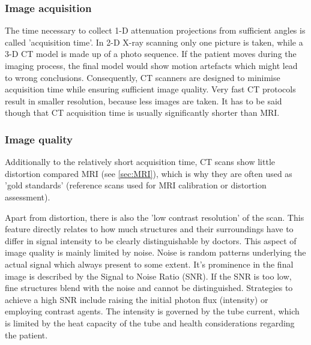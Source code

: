 \subsubsection{Image acquisition}
The time necessary to collect 1-D attenuation projections from sufficient angles is called 'acquisition time'.
In 2-D X-ray scanning only one picture is taken, while a 3-D CT model is made up of a photo sequence.
If the patient moves during the imaging process, the final model would show motion artefacts which might lead to wrong conclusions.
Consequently, CT scanners are designed to minimise acquisition time while ensuring sufficient image quality.
Very fast CT protocols result in smaller resolution, because less images are taken.
It has to be said though that CT acquisition time is usually significantly shorter than MRI. \cite{Podgorsak, Maidment2014}

\subsubsection{Image quality} %
Additionally to the relatively short acquisition time, CT scans show little distortion compared MRI (see \ref{sec:MRI}), which is why they are often used as 'gold standards' (reference scans used for MRI calibration or distortion assessment).

Apart from distortion, there is also the 'low contrast resolution' of the scan.
This feature directly relates to how much structures and their surroundings have to differ in signal intensity to be clearly distinguishable by doctors.
This aspect of image quality is mainly limited by noise.
Noise is random patterns underlying the actual signal which always present to some extent.
It's prominence in the final image is described by the Signal to Noise Ratio (SNR).
If the SNR is too low, fine structures blend with the noise and cannot be distinguished. 
Strategies to achieve a high SNR include raising the initial photon flux (intensity) or employing contrast agents.
The intensity is governed by the tube current, which is limited by the heat capacity of the tube and health considerations regarding the patient.

